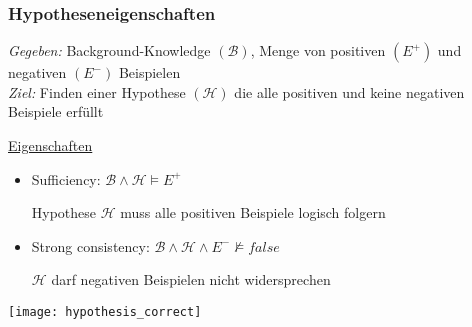 \begin{frame}
	\frametitle{Hypotheseneigenschaften}
	\emph{Gegeben:} Background-Knowledge $(\mathcal{B})$, Menge von positiven $(E^+)$ und negativen $(E^-)$ Beispielen\\
	\emph{Ziel:} Finden einer Hypothese $(\mathcal{H})$ die alle positiven und keine negativen
	Beispiele erfüllt

	\begin{minipage}{0.5\textwidth}
		\vspace{5pt}
		\underline{Eigenschaften}
		\begin{itemize}
			\item Sufficiency:        $\mathcal{B} \land \mathcal{H} \vDash E^{+}$

				Hypothese $\mathcal{H}$ muss alle positiven Beispiele logisch folgern

			\item Strong consistency: $\mathcal{B} \land \mathcal{H} \land E^{-} \nvDash false$

				$\mathcal{H}$ darf negativen Beispielen nicht widersprechen
		\end{itemize}
	\end{minipage}
	\begin{minipage}{0.45\textwidth}
		\centering
		\texttt{[image: hypothesis\_correct]}
	\end{minipage}
\end{frame}
%
%
%
%
%
%
%
%
